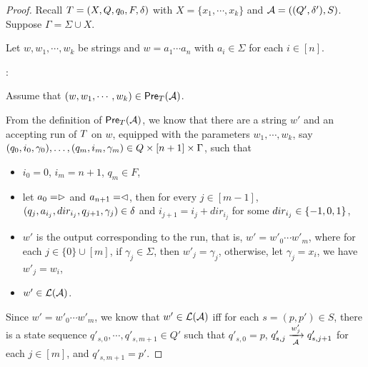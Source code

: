 \begin{proof}
Recall $T = (X, Q, q_0, F, \delta)$ with $X= \{x_1,\cdots, x_k\}$ and $\mathcal{A} =( (Q', \delta'), S)$. 
Suppose $\Gamma = \Sigma \cup X$. 

Let $w, w_1, \cdots, w_k$ be strings and $w = a_1 \cdots a_n$ with $a_i \in \Sigma$ for each $i \in [n]$.

\smallskip

: 

\smallskip

Assume that $(w, w_1,\cdots, w_k) \in \textsf{Pre}_{T}(\mathcal{A})$.


From the definition of $\textsf{Pre}_{T}(\mathcal{A})$, we know that there are a string $w' $ and an accepting run of $T$ on $w$, equipped with the parameters $w_1,\cdots, w_k$, say $(q_0, i_0, \gamma_0),\ldots, (q_m, i_m, \gamma_m) \in Q \times [n+1] \times \Gamma$, such that 
%
\begin{itemize}
\item $i_0=0$, $i_m = n+1$, $q_m \in F$,
%
\item let $a_0 = \vartriangleright$ and $a_{n+1} = \vartriangleleft$,  then for every $j \in [m-1]$, $(q_j, a_{i_j}, dir_{i_j}, q_{j+1}, \gamma_j) \in
        \delta$ and $i_{j+1} = i_j + dir_{i_j}$ for some $dir_{i_j} \in \{-1, 0, 1\}$, 
 \item $w'$ is the output corresponding to the run, that is, $ w' = w'_0 \cdots w'_m$, where for each $j \in \{0\} \cup [m]$, if $\gamma_j \in \Sigma$, then $w'_j = \gamma_j$, otherwise, let $\gamma_j = x_i$, we have $w'_j = w_i$,
 \item  $w' \in \mathcal{L}(\mathcal{A})$.
\end{itemize}

Since $ w' = w'_0 \cdots w'_m$, we know that $w' \in \mathcal{L}(\mathcal{A})$ iff for each $s=(p, p') \in S$, there is a state sequence $q'_{s,0}, \cdots, q'_{s,m+1} \in Q'$ such that  $q'_{s,0}= p$, $q'_{s,j} \xrightarrow[\mathcal{A}]{w'_j} q'_{s, j+1}$ for each $j \in [m]$,  and $q'_{s, m+1} = p'$.


\end{proof}
